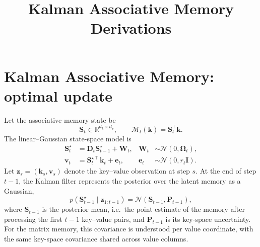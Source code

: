 \documentclass[11pt]{article}
\title{Kalman Associative Memory Derivations}
\author{}
\date{}
\newcommand{\R}{\mathbb{R}}
\newcommand{\ve}[1]{\boldsymbol{#1}}
\newcommand{\tr}{\intercal}
\begin{document}
\maketitle

\section{Kalman Associative Memory: optimal update}

Let the associative-memory state be
\[
  \ve{S}_t \in \R^{d_k\times d_v},
  \qquad
  \mathcal{M}_t(\ve{k})=\ve{S}_t^{\tr}\ve{k}.
\]
The linear--Gaussian state-space model is
\begin{align}
  \ve{S}_t^\star
  &= \ve{D}_t\ve{S}_{t-1}^\star+\ve{W}_t,
  &
  \ve{W}_t&\sim\mathcal{N}(0,\ve{\Omega}_t), \\
  \ve{v}_t
  &= \ve{S}_t^{\star\tr}\ve{k}_t+\ve{e}_t,
  &
  \ve{e}_t&\sim\mathcal{N}(0,r_t\ve{I}).
\end{align}
Let $\ve{z}_s=(\ve{k}_s,\ve{v}_s)$ denote the key--value observation at step $s$.
At the end of step $t-1$, the Kalman filter represents the posterior over the latent
memory as a Gaussian,
\begin{equation}
  p(\ve{S}_{t-1}^\star\mid \ve{z}_{1:t-1})
  =
  \mathcal{N}(\ve{S}_{t-1},\ve{P}_{t-1}),
  \label{eq:previous-filtering-posterior}
\end{equation}
where $\ve{S}_{t-1}$ is the posterior mean, i.e.\ the point estimate of the memory after
processing the first $t-1$ key--value pairs, and $\ve{P}_{t-1}$ is its key-space uncertainty.
For the matrix memory, this covariance is understood per value coordinate, with the same
key-space covariance shared across value columns.
\end{document}
